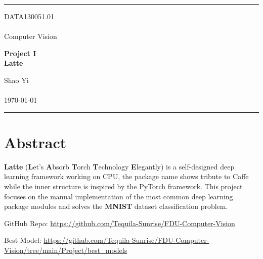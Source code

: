 \documentclass[a4paper, 11pt]{article} %
\begin{document}

\fancyhead[C]{}
\hrule \medskip %
\begin{minipage}{0.295\textwidth} %
	\raggedright
	DATA130051.01\\ %
	\footnotesize %
	\hfill\\
	Computer Vision\\ %
\end{minipage}
\begin{minipage}{0.4\textwidth} %
	\centering
	\large %
	\textbf{Project I}\\ %
	\normalsize %
	\textbf{Latte}\\ %
\end{minipage}
\begin{minipage}{0.295\textwidth} %
	\raggedleft
	Shao Yi\\ %
	\footnotesize %
	\hfill\\
	\today\\ %
\end{minipage}
\medskip\hrule %
\bigskip


\section*{\textbf{Abstract}}

\textbf{Latte} (\textbf{L}et's \textbf{A}bsorb \textbf{T}orch \textbf{T}echnology
\textbf{E}legantly) is a self-designed deep learning framework working on CPU, the package
name shows tribute to Caffe while the inner structure is inspired by the PyTorch framework.
This project focuses on the manual implementation of the most common deep learning package
modules and solves the \textbf{MNIST} dataset classification problem.

GitHub Repo: \url{https://github.com/Tequila-Sunrise/FDU-Computer-Vision}

Best Model: \url{https://github.com/Tequila-Sunrise/FDU-Computer-Vision/tree/main/Project/best_models}
\end{document}

